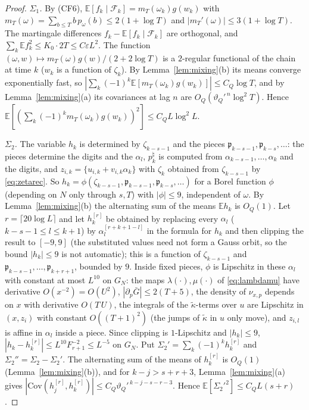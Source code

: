 \documentclass[11pt]{amsart}
\theoremstyle{definition}
\numberwithin{equation}{section}
\newcommand{\E}{\mathbb{E}}
\newcommand{\cF}{\mathcal{F}}
\newcommand{\fp}{\mathfrak{p}}
\newcommand{\fr}[1]{\{#1\}}
\newcommand{\eps}{\varepsilon}
\begin{document}
\begin{proof}
\emph{$\Sigma_1$.} By (CF6), $\E[f_k\mid\cF_k]=m_T(\omega_k)g(w_k)$ with $m_T(\omega)=\sum_{b\le T}b\,p_\omega(b)\le2(1+\log T)$ and
$|m_T'(\omega)|\le3(1+\log T)$. The martingale differences $f_k-\E[f_k\mid\cF_k]$ are orthogonal, and $\sum_k\E f_k^2\le K_0\cdot2T\le C\eps L^2$. The function
$(\omega,w)\mapsto m_T(\omega)g(w)/(2+2\log T)$ is a $2$-regular functional of the chain at time $k$ ($w_k$ is a function of $\zeta_k$). By
Lemma~\ref{lem:mixing}(b) its means converge exponentially fast, so $|\sum_k(-1)^k\E[m_T(\omega_k)g(w_k)]|\le C_Q\log T$, and by Lemma~\ref{lem:mixing}(a)
its covariances at lag $n$ are $O_Q(\vartheta_Q'^{\,n}\log^2T)$. Hence $\E[(\sum_k(-1)^km_T(\omega_k)g(w_k))^2]\le C_QL\log^2L$.

\emph{$\Sigma_2$.} The variable $h_k$ is determined by $\zeta_{k-s-1}$ and the pieces $\fp_{k-s-1},\fp_{k-s},\dots$: the pieces determine the digits and the
$\alpha_l$, $p^\natural_k$ is computed from $\alpha_{k-s-1},\dots,\alpha_k$ and the digits, and $z_{i,k}=\fr{u_{i,k}+v_{i,k}\alpha_k}$ with $\zeta_k$ obtained from
$\zeta_{k-s-1}$ by \eqref{eq:zetarec}. So $h_k=\phi(\zeta_{k-s-1},\fp_{k-s-1},\fp_{k-s},\dots)$ for a Borel function $\phi$ (depending on $N$ only through
$s,T$) with $|\phi|\le9$, independent of $\omega$. By Lemma~\ref{lem:mixing}(b) the alternating sum of the means $\E h_k$ is $O_Q(1)$. Let $r=\lceil20\log L\rceil$ and
let $h^{[r]}_k$ be obtained by replacing every $\alpha_l$ ($k-s-1\le l\le k+1$) by $\alpha_l^{[r+k+1-l]}$ in the formula for $h_k$ and then clipping the
result to $[-9,9]$ (the substituted values need not form a Gauss orbit, so the bound $|h_k|\le9$ is not automatic); this is a function of $\zeta_{k-s-1}$ and
$\fp_{k-s-1},\dots,\fp_{k+r+1}$, bounded by $9$. Inside fixed pieces, $\phi$ is Lipschitz in these $\alpha_l$ with constant at most $L^{10}$ on $G_N$: the maps
$\lambda(\cdot),\mu(\cdot)$ of \eqref{eq:lambdamu} have derivative $O(x^{-2})=O(U^2)$, $|\partial_p\bar G|\le2(T+5)$, the density of $\nu_{x,p}$ depends on
$x$ with derivative $O(T\,U)$, the integrals of the $\tilde\kappa$-terms over $u$ are Lipschitz in $(x,z_i)$ with constant $O((T+1)^2)$ (the jumps of
$\tilde\kappa$ in $u$ only move), and $z_{i,l}$ is affine in $\alpha_l$ inside a piece. Since clipping is $1$-Lipschitz and $|h_k|\le9$, $|h_k-h_k^{[r]}|\le L^{10}F_{r+1}^{-2}\le L^{-5}$ on $G_N$. Put
$\Sigma_2'=\sum_k(-1)^kh^{[r]}_k$ and $\Sigma_2''=\Sigma_2-\Sigma_2'$. The alternating sum of the means of $h^{[r]}_k$ is $O_Q(1)$ (Lemma~\ref{lem:mixing}(b)), and for
$k-j>s+r+3$, Lemma~\ref{lem:mixing}(a) gives $|\mathrm{Cov}(h^{[r]}_j,h^{[r]}_k)|\le C_Q\vartheta_Q'^{\,k-j-s-r-3}$. Hence
$\E[\Sigma_2'^2]\le C_QL(s+r)$.
\end{proof}
\end{document}
